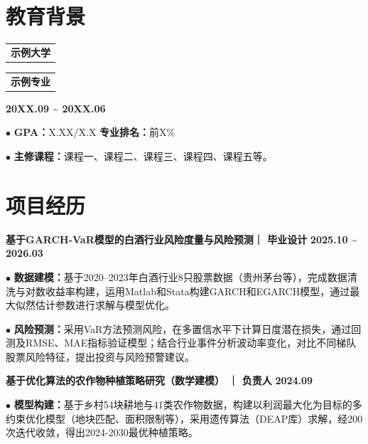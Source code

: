 \documentclass[11pt,a4paper,fontset=none]{ctexart}
\newcommand{\daterange}[1]{{\textbf{#1}}}
\newcommand{\entrytitle}[1]{{\textbf{#1}}}
\begin{document}
\vspace{0.6em}

\section*{教育背景}
\vspace{-0.3em}

\noindent
\begin{tabular}{@{}p{7cm}@{}}
    \textbf{示例大学}
\end{tabular}
\begin{tabular}{@{}p{7cm}@{}}
    \textbf{示例专业}
\end{tabular}
\hfill\textbf{20XX.09 \textasciitilde{} 20XX.06}

\par\noindent
$\bullet$ \textbf{GPA：}X.XX/X.X \hspace{4em} \textbf{专业排名：}前X\%

\par\noindent
$\bullet$ \textbf{主修课程：}课程一、课程二、课程三、课程四、课程五等。

\section*{项目经历}
\vspace{-0.1em}

\noindent
\entrytitle{基于GARCH-VaR模型的白酒行业风险度量与风险预测｜ 毕业设计}
\hfill \daterange{2025.10 \textasciitilde{} 2026.03}

\par\noindent
$\bullet$ \textbf{数据建模：}基于2020–2023年白酒行业8只股票数据（贵州茅台等），完成数据清洗与对数收益率构建，运用Matlab和Stata构建GARCH和EGARCH模型，通过最大似然估计参数进行求解与模型优化。

\par\noindent
$\bullet$ \textbf{风险预测：}采用VaR方法预测风险，在多置信水平下计算日度潜在损失，通过回测及RMSE、MAE指标验证模型；结合行业事件分析波动率变化，对比不同梯队股票风险特征，提出投资与风险预警建议。

\noindent
\entrytitle{基于优化算法的农作物种植策略研究（数学建模） ｜ 负责人}
\hfill \daterange{2024.09}

\par\noindent
$\bullet$ \textbf{模型构建：}基于乡村54块耕地与41类农作物数据，构建以利润最大化为目标的多约束优化模型（地块匹配、面积限制等），采用遗传算法（DEAP库）求解，经200次迭代收敛，得出2024-2030最优种植策略。
\end{document}
